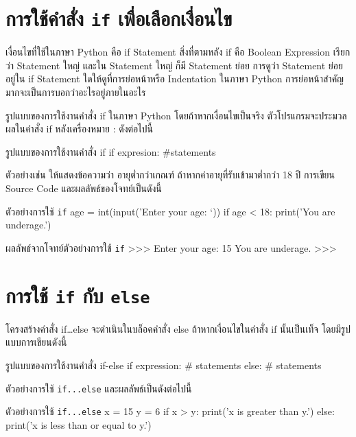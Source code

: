 \section{การใช้คำสั่ง \texttt{if} เพื่อเลือกเงื่อนไข}

เงื่อนไขที่ใช้ในภาษา Python คือ if Statement สิ่งที่ตามหลัง if คือ Boolean Expression เรียกว่า Statement ใหญ่ และใน Statement ใหญ่ ก็มี Statement ย่อย การดูว่า Statement ย่อยอยู่ใน if Statement ใดให้ดูที่การย่อหน้าหรือ Indentation ในภาษา Python การย่อหน้าสำคัญมากจะเป็นการบอกว่าอะไรอยู่ภายในอะไร 

รูปแบบของการใช้งานคำสั่ง if ในภาษา Python โดยถ้าหากเงื่อนไขเป็นจริง ตัวโปรแกรมจะประมวลผลในคำสั่ง if หลังเครื่องหมาย :  ดังต่อไปนี้

\begin{codelist}{รูปแบบของการใช้งานคำสั่ง if}{}
if expresion:
    #statements
\end{codelist}

ตัวอย่างเช่น ให้แสดงข้อความว่า อายุต่ำกว่าเกณฑ์ ถ้าหากค่าอายุที่รับเข้ามาต่ำกว่า 18 ปี การเขียน Source Code และผลลัพธ์ของโจทย์เป็นดังนี้ 

\begin{codelist}{ตัวอย่างการใช้ \texttt{if}}{}
age = int(input('Enter your age: `))
if age < 18:
   print('You are underage.')
\end{codelist}

\begin{codelist}{ผลลัพธ์จากโจทย์ตัวอย่างการใช้ \texttt{if}}{}
>>>
Enter your age: 15
You are underage.
>>>
\end{codelist}


\section{การใช้ \texttt{if} กับ \texttt{else}}

โครงสร้างคำสั่ง if…else จะดำเนินในบล็อคคำสั่ง else ถ้าหากเงื่อนไขในคำสั่ง if นั้นเป็นเท็จ โดยมีรูปแบบการเขียนดังนี้

\begin{codelist}{รูปแบบของการใช้งานคำสั่ง if-else}{}
if expression:
    # statements
else:
    # statements
\end{codelist}

ตัวอย่างการใช้ \texttt{if...else} และผลลัพธ์เป็นดังต่อไปนี้

\begin{codelist}{ตัวอย่างการใช้ \texttt{if...else}}{}
x = 15
y = 6
if x > y: print('x is greater than y.')
else: print('x is less than or equal to y.')
\end{codelist}


